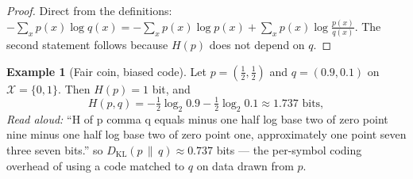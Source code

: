 \documentclass[11pt]{article}
\theoremstyle{definition}
\newtheorem{example}[theorem]{Example}
\newcommand{\KL}{D_{\mathrm{KL}}}
\newcommand{\X}{\mathcal{X}}
\begin{document}
\begin{proof}
Direct from the definitions: $-\sum_x p(x) \log q(x) = -\sum_x p(x) \log p(x) + \sum_x p(x) \log \frac{p(x)}{q(x)}$.
The second statement follows because $H(p)$ does not depend on $q$.
\end{proof}

\begin{example}[Fair coin, biased code]
Let $p = (\tfrac{1}{2}, \tfrac{1}{2})$ and $q = (0.9, 0.1)$ on $\X = \{0, 1\}$.
Then $H(p) = 1$ bit, and
\[
  H(p, q) = -\tfrac{1}{2} \log_2 0.9 - \tfrac{1}{2} \log_2 0.1 \approx 1.737 \text{ bits},
\]
\emph{Read aloud:} ``H of p comma q equals minus one half log base two of zero
point nine minus one half log base two of zero point one, approximately one
point seven three seven bits.''
so $\KL(p \,\|\, q) \approx 0.737$ bits --- the per-symbol coding overhead of
using a code matched to $q$ on data drawn from $p$.
\end{example}
\end{document}
